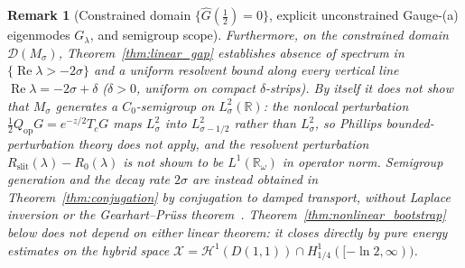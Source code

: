 \documentclass[11pt,a4paper]{article}
\newtheorem{remark}{Remark}
\begin{document}
\begin{remark}[Constrained domain $\{\widehat{G}(\tfrac12)=0\}$, explicit unconstrained Gauge-(a) eigenmodes $G_\lambda$, and semigroup scope]
Furthermore, on the constrained domain $\mathcal{D}(M_\sigma)$, Theorem~\ref{thm:linear_gap}
establishes absence of spectrum in $\{\operatorname{Re}\lambda>-2\sigma\}$ and a uniform resolvent bound along
every vertical line $\operatorname{Re}\lambda=-2\sigma+\delta$ ($\delta>0$, uniform on compact $\delta$-strips).  By itself it does
\emph{not} show that $M_\sigma$ generates a $C_0$-semigroup on $L^2_\sigma(\mathbb{R})$: the nonlocal perturbation
$\tfrac12 Q_{\mathrm{op}}G = e^{-z/2}T_c G$ maps $L^2_\sigma$ into $L^2_{\sigma-1/2}$
rather than $L^2_\sigma$, so Phillips bounded-perturbation theory does not apply, and the
resolvent perturbation $R_{\mathrm{slit}}(\lambda)-R_0(\lambda)$ is not shown to be $L^1(\mathbb{R}_\omega)$
in operator norm.  Semigroup generation and the decay rate $2\sigma$ are instead obtained in
Theorem~\ref{thm:conjugation} by conjugation to damped transport, without Laplace inversion or the
Gearhart--Pr\"uss theorem~\cite[Thm.~V.1.11]{engelnagel2000}.  Theorem~\ref{thm:nonlinear_bootstrap} below does
\emph{not} depend on either linear theorem: it closes directly by pure energy
estimates on the hybrid space $\mathcal{X}=\mathcal{H}^1(D(1,1))\cap H^1_{1/4}([-\ln 2,\infty))$.
\end{remark}
\end{document}
